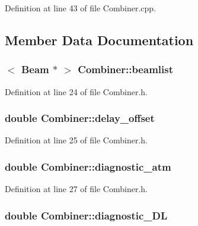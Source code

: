 Definition at line 43 of file Combiner.cpp.



\subsection{Member Data Documentation}
\hypertarget{classCombiner_ae36808805deccd22a33012b67783d7f6}{
\subsubsection[{beamlist}]{$<$ {\bf Beam} $\ast$ $>$ {\bf Combiner::beamlist}}}
\label{classCombiner_ae36808805deccd22a33012b67783d7f6}


Definition at line 24 of file Combiner.h.

\hypertarget{classCombiner_acd026e8b726df8c49812ee99a4a2c94b}{
\subsubsection[{delay\_\-offset}]{\setlength{\rightskip}{0pt plus 5cm}double {\bf Combiner::delay\_\-offset}}}
\label{classCombiner_acd026e8b726df8c49812ee99a4a2c94b}


Definition at line 25 of file Combiner.h.

\hypertarget{classCombiner_a7e44ac6556a4b96f1f3f52986970df33}{
\subsubsection[{diagnostic\_\-atm}]{\setlength{\rightskip}{0pt plus 5cm}double {\bf Combiner::diagnostic\_\-atm}}}
\label{classCombiner_a7e44ac6556a4b96f1f3f52986970df33}


Definition at line 27 of file Combiner.h.

\hypertarget{classCombiner_a7e51816d5a254fab875a6d25198fc322}{
\subsubsection[{diagnostic\_\-DL}]{\setlength{\rightskip}{0pt plus 5cm}double {\bf Combiner::diagnostic\_\-DL}}}
\label{classCombiner_a7e51816d5a254fab875a6d25198fc322}


